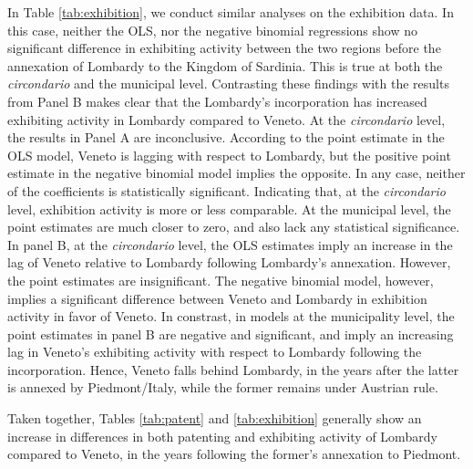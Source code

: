 In Table \ref{tab:exhibition}, we conduct similar analyses on the exhibition data. %
In this case, neither the OLS, nor the negative binomial regressions show no significant difference in exhibiting activity between the two regions before the annexation of Lombardy to the Kingdom of Sardinia. 
This is true at both the \textit{circondario} and the municipal level. 
Contrasting these findings with the results from Panel B makes clear that the Lombardy's incorporation has increased exhibiting activity in Lombardy compared to Veneto. 
At the \textit{circondario} level, the results in Panel A are inconclusive. 
According to the point estimate in the OLS model, Veneto is lagging with respect to Lombardy, but the positive point estimate in the negative binomial model implies the opposite. 
In any case, neither of the coefficients is statistically significant. Indicating that, at the \textit{circondario} level, exhibition activity is more or less comparable. 
At the municipal level, the point estimates are much closer to zero, and also lack any statistical significance. 
In panel B, at the \textit{circondario} level, the OLS estimates imply an increase in the lag of Veneto relative to Lombardy following Lombardy's annexation. 
However, the point estimates are insignificant. 
The negative binomial model, however, implies a significant difference between Veneto and Lombardy in exhibition activity in favor of Veneto. 
In constrast, in models at the municipality level, the point estimates in panel B are negative and significant, and imply an increasing lag in Veneto's exhibiting activity with respect to Lombardy following the incorporation.
Hence, Veneto falls behind Lombardy, in the years after the latter is annexed by Piedmont/Italy, while the former remains under Austrian rule. 

Taken together, Tables \ref{tab:patent} and \ref{tab:exhibition} generally show an increase in differences in both patenting and exhibiting activity of Lombardy compared to Veneto, in the years following the former's annexation to Piedmont. 

